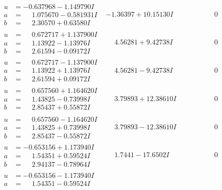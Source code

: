 \documentclass[1p]{elsarticle_modified}
\theoremstyle{definition}
\begin{document}
$$\begin{array}{c|c|c}
\begin{aligned}
u &= -0.637968 - 1.149790 I \\
a &= \phantom{-}1.075670 - 0.581931 I \\
b &= \phantom{-}2.30570 + 0.63580 I\end{aligned}
 & -1.36397 + 10.15130 I & \phantom{-0.000000 } 0 \\ \hline\begin{aligned}
u &= \phantom{-}0.672717 + 1.137900 I \\
a &= \phantom{-}1.13922 - 1.13976 I \\
b &= \phantom{-}2.61594 - 0.09172 I\end{aligned}
 & \phantom{-}4.56281 + 9.42738 I & \phantom{-0.000000 } 0 \\ \hline\begin{aligned}
u &= \phantom{-}0.672717 - 1.137900 I \\
a &= \phantom{-}1.13922 + 1.13976 I \\
b &= \phantom{-}2.61594 + 0.09172 I\end{aligned}
 & \phantom{-}4.56281 - 9.42738 I & \phantom{-0.000000 } 0 \\ \hline\begin{aligned}
u &= \phantom{-}0.657560 + 1.164620 I \\
a &= \phantom{-}1.43825 - 0.73998 I \\
b &= \phantom{-}2.85437 + 0.55872 I\end{aligned}
 & \phantom{-}3.79893 + 12.38610 I & \phantom{-0.000000 } 0 \\ \hline\begin{aligned}
u &= \phantom{-}0.657560 - 1.164620 I \\
a &= \phantom{-}1.43825 + 0.73998 I \\
b &= \phantom{-}2.85437 - 0.55872 I\end{aligned}
 & \phantom{-}3.79893 - 12.38610 I & \phantom{-0.000000 } 0 \\ \hline\begin{aligned}
u &= -0.653156 + 1.173940 I \\
a &= \phantom{-}1.54351 + 0.59524 I \\
b &= \phantom{-}2.94137 - 0.78964 I\end{aligned}
 & \phantom{-}1.7441 - 17.6502 I & \phantom{-0.000000 } 0 \\ \hline\begin{aligned}
u &= -0.653156 - 1.173940 I \\
a &= \phantom{-}1.54351 - 0.59524 I \\

\end{aligned}
\end{array}$$
\end{document}
